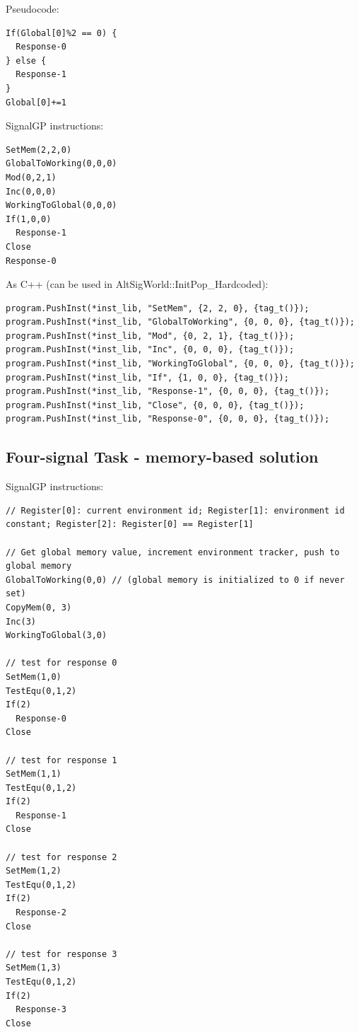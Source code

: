 \documentclass[]{book}
\begin{document}
Pseudocode:

\begin{verbatim}
If(Global[0]%2 == 0) {
  Response-0
} else {
  Response-1
}
Global[0]+=1
\end{verbatim}

SignalGP instructions:

\begin{verbatim}
SetMem(2,2,0)
GlobalToWorking(0,0,0)
Mod(0,2,1)
Inc(0,0,0)
WorkingToGlobal(0,0,0)
If(1,0,0)
  Response-1
Close
Response-0
\end{verbatim}

As C++ (can be used in AltSigWorld::InitPop\_Hardcoded):

\begin{verbatim}
program.PushInst(*inst_lib, "SetMem", {2, 2, 0}, {tag_t()});
program.PushInst(*inst_lib, "GlobalToWorking", {0, 0, 0}, {tag_t()});
program.PushInst(*inst_lib, "Mod", {0, 2, 1}, {tag_t()});
program.PushInst(*inst_lib, "Inc", {0, 0, 0}, {tag_t()});
program.PushInst(*inst_lib, "WorkingToGlobal", {0, 0, 0}, {tag_t()});
program.PushInst(*inst_lib, "If", {1, 0, 0}, {tag_t()});
program.PushInst(*inst_lib, "Response-1", {0, 0, 0}, {tag_t()});
program.PushInst(*inst_lib, "Close", {0, 0, 0}, {tag_t()});
program.PushInst(*inst_lib, "Response-0", {0, 0, 0}, {tag_t()});
\end{verbatim}

\hypertarget{four-signal-task---memory-based-solution}{%
\subsection{Four-signal Task - memory-based solution}\label{four-signal-task---memory-based-solution}}

SignalGP instructions:

\begin{verbatim}
// Register[0]: current environment id; Register[1]: environment id constant; Register[2]: Register[0] == Register[1]

// Get global memory value, increment environment tracker, push to global memory
GlobalToWorking(0,0) // (global memory is initialized to 0 if never set)
CopyMem(0, 3)
Inc(3)
WorkingToGlobal(3,0)

// test for response 0
SetMem(1,0)
TestEqu(0,1,2)
If(2)
  Response-0
Close

// test for response 1
SetMem(1,1)
TestEqu(0,1,2)
If(2)
  Response-1
Close

// test for response 2
SetMem(1,2)
TestEqu(0,1,2)
If(2)
  Response-2
Close

// test for response 3
SetMem(1,3)
TestEqu(0,1,2)
If(2)
  Response-3
Close
\end{verbatim}
\end{document}
